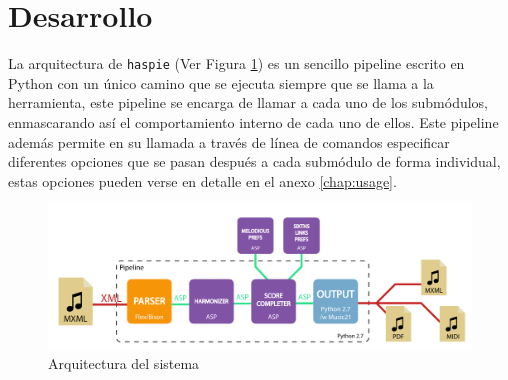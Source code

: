 \section{Desarrollo}
\label{sec:development}
La arquitectura de \texttt{haspie} (Ver Figura \ref{fig:arquitectura_final}) es un sencillo pipeline escrito en Python con un único camino que se ejecuta siempre que se llama a la herramienta, este pipeline se encarga de llamar a cada uno de los submódulos, enmascarando así el comportamiento interno de cada uno de ellos. Este pipeline además permite en su llamada a través de línea de comandos especificar diferentes opciones que se pasan después a cada submódulo de forma individual, estas opciones pueden verse en detalle en el anexo \ref{chap:usage}.

\begin{figure}[h]
	\centering
	\includegraphics[width=0.8\linewidth]{imagenes/arquitectura_final.pdf}
	\caption{Arquitectura del sistema}
	\label{fig:arquitectura_final}
\end{figure}

